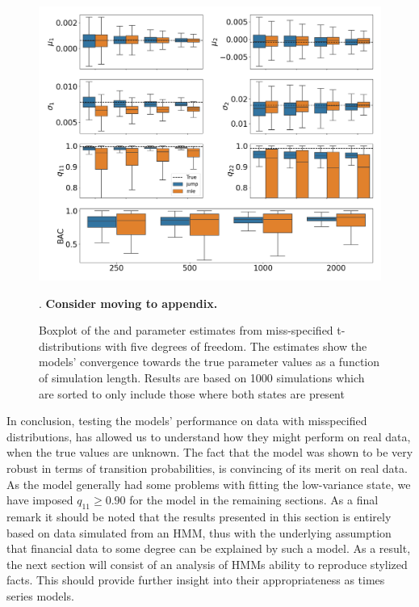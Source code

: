 \begin{figure}[H] 
    \centering
    \includegraphics[width=1\textwidth]{analysis/model_convergence/images/simulation_t_box_2states.png}
    
    
    
    \caption[Boxplot of the \mle and \jump parameter estimates from miss-specified t-distributions with five degrees of freedom. Sorted version]{Boxplot of the \mle and \jump parameter estimates from miss-specified t-distributions with five degrees of freedom. The estimates show the models' convergence towards the true parameter values as a function of simulation length. Results are based on 1000 simulations which are sorted to only include those where both states are present}. \textbf{Consider moving to appendix.}
    \label{fig:jump_t_box_2states}
\end{figure}

In conclusion, testing the models' performance on data with misspecified distributions, has allowed us to understand how they might perform on real data, when the true values are unknown. The fact that the \jump model was shown to be very robust in terms of transition probabilities, is convincing of its merit on real data. As the \mle model generally had some problems with fitting the low-variance state, we have imposed $q_{11}\geq 0.90$ for the model in the remaining sections. As a final remark it should be noted that the results presented in this section is entirely based on data simulated from an HMM, thus with the underlying assumption that financial data to some degree can be explained by such a model. As a result, the next section will consist of an analysis of HMMs ability to reproduce stylized facts. This should provide further insight into their appropriateness as times series models.